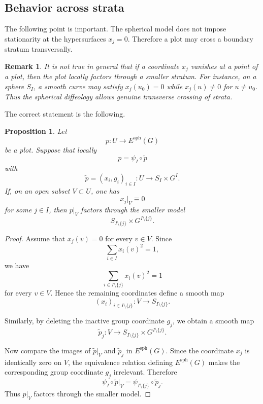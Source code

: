 \documentclass[11pt]{amsart}
\newtheorem{proposition}[definition]{Proposition}
\newtheorem{remark}[definition]{Remark}
\begin{document}
\subsection{Behavior across strata}

The following point is important. The spherical model does not impose
stationarity at the hypersurfaces \(x_j=0\). Therefore a plot may cross a
boundary stratum transversally.

\begin{remark}
It is not true in general that if a coordinate \(x_j\) vanishes at a point of a
plot, then the plot locally factors through a smaller stratum. For instance,
on a sphere \(S_I\), a smooth curve may satisfy \(x_j(u_0)=0\) while
\(x_j(u)\neq0\) for \(u\neq u_0\). Thus the spherical diffeology allows
genuine transverse crossing of strata.
\end{remark}

The correct statement is the following.

\begin{proposition}
Let
\[
p:U\to E^{\mathrm{sph}}(G)
\]
be a plot. Suppose that locally
\[
p=\psi_I\circ \widetilde p
\]
with
\[
\widetilde p=(x_i,g_i)_{i\in I}:U\to S_I\times G^I.
\]
If, on an open subset \(V\subset U\), one has
\[
x_j|_V\equiv0
\]
for some \(j\in I\), then \(p|_V\) factors through the smaller model
\[
S_{I\setminus\{j\}}\times G^{I\setminus\{j\}}.
\]
\end{proposition}

\begin{proof}
Assume that \(x_j(v)=0\) for every \(v\in V\). Since
\[
\sum_{i\in I}x_i(v)^2=1,
\]
we have
\[
\sum_{i\in I\setminus\{j\}}x_i(v)^2=1
\]
for every \(v\in V\). Hence the remaining coordinates define a smooth map
\[
(x_i)_{i\in I\setminus\{j\}}:V\to S_{I\setminus\{j\}}.
\]

Similarly, by deleting the inactive group coordinate \(g_j\), we obtain a
smooth map
\[
\widetilde p_j:V\to S_{I\setminus\{j\}}\times G^{I\setminus\{j\}}.
\]

Now compare the images of \(\widetilde p|_V\) and \(\widetilde p_j\) in
\(E^{\mathrm{sph}}(G)\). Since the coordinate \(x_j\) is identically zero on
\(V\), the equivalence relation defining \(E^{\mathrm{sph}}(G)\) makes the
corresponding group coordinate \(g_j\) irrelevant. Therefore
\[
\psi_I\circ\widetilde p|_V
=
\psi_{I\setminus\{j\}}\circ\widetilde p_j.
\]
Thus \(p|_V\) factors through the smaller model.
\end{proof}
\end{document}
